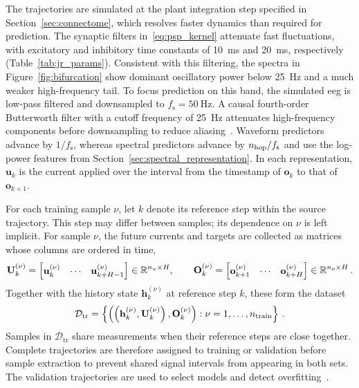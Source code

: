 The trajectories are simulated at the plant integration step specified in Section~\ref{sec:connectome}, which resolves faster dynamics than required for prediction.
The synaptic filters in~\eqref{eq:psp_kernel} attenuate fast fluctuations, with excitatory and inhibitory time constants of \SI{10}{\milli\second} and \SI{20}{\milli\second}, respectively (Table~\ref{tab:jr_params}).
Consistent with this filtering, the spectra in Figure~\ref{fig:bifurcation} show dominant oscillatory power below \SI{25}{\hertz} and a much weaker high-frequency tail.
To focus prediction on this band, the simulated \ac{eeg} is low-pass filtered and downsampled to $f_\mathrm{s}=\SI{50}{\hertz}$.
A causal fourth-order Butterworth filter with a cutoff frequency of \SI{25}{\hertz} attenuates high-frequency components before downsampling to reduce aliasing~\cite{Oppenheim2010}.
Waveform predictors advance by $1/f_\mathrm{s}$, whereas spectral predictors advance by $n_{\mathrm{hop}}{}/f_\mathrm{s}$ and use the log-power features from Section~\ref{sec:spectral_representation}.
In each representation, $\mathbf{u}_k$ is the current applied over the interval from the timestamp of $\mathbf{o}_k$ to that of $\mathbf{o}_{k+1}$.

For each training sample $\nu$, let $k$ denote its reference step within the source trajectory.
This step may differ between samples; its dependence on $\nu$ is left implicit.
For sample $\nu$, the future currents and targets are collected as matrices whose columns are ordered in time,
\begin{equation*}
    \mathbf U^{(\nu)}_{k}
    =\begin{bmatrix}\mathbf u^{(\nu)}_{k}&\cdots&\mathbf u^{(\nu)}_{k+H-1}\end{bmatrix}
    \in\mathbb R^{n_{u}\times H},\qquad
    \mathbf O^{(\nu)}_{k}
    =\begin{bmatrix}\mathbf o^{(\nu)}_{k+1}&\cdots&\mathbf o^{(\nu)}_{k+H}\end{bmatrix}
    \in\mathbb R^{n_{o}\times H}\,.
\end{equation*}
Together with the history state $\mathbf h_k^{(\nu)}$ at reference step $k$, these form the dataset
\begin{equation*}
    \mathcal D_{\mathrm{tr}}
    =\left\{\left(\left(\mathbf h^{(\nu)}_{k},\mathbf U^{(\nu)}_{k}\right),
    \mathbf O^{(\nu)}_{k}\right) : \nu=1,\ldots,n_{\mathrm{train}}{}\right\}\,.
\end{equation*}
Samples in $\mathcal D_{\mathrm{tr}}$ share measurements when their reference steps are close together.
Complete trajectories are therefore assigned to training or validation before sample extraction to prevent shared signal intervals from appearing in both sets.
The validation trajectories are used to select models and detect overfitting~\cite{Goodfellow2016}.

